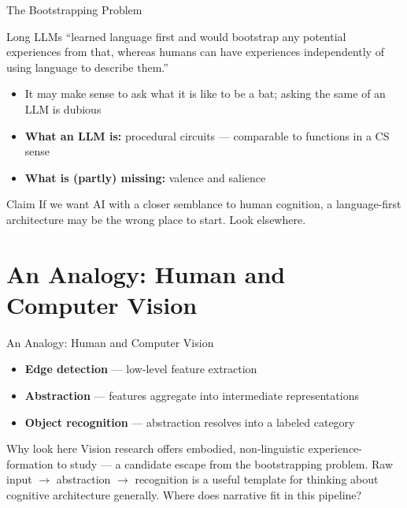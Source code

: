\documentclass[aspectratio=169]{beamer}
\begin{document}
\begin{frame}{The Bootstrapping Problem}
  \begin{block}{Long \parencite{long2026experience}}
    LLMs ``learned language first and would bootstrap any potential experiences from that, whereas humans can have experiences independently of using language to describe them.''
  \end{block}

  \pause
  \vspace{1em}
  \begin{itemize}
    \item<2-> It may make sense to ask what it is like to be a bat; asking the same of an LLM is dubious
    \item<3-> \textbf{What an LLM is:} procedural circuits --- comparable to functions in a CS sense
    \item<4-> \textbf{What is (partly) missing:} valence and salience
  \end{itemize}

  \pause
  \vspace{1em}
  \begin{alertblock}{Claim}
    If we want AI with a closer semblance to human cognition, a language-first architecture may be the wrong place to start. Look elsewhere.
  \end{alertblock}
\end{frame}

\section{An Analogy: Human and Computer Vision}

\begin{frame}{An Analogy: Human and Computer Vision}
  \begin{itemize}
    \item<1-> \textbf{Edge detection} --- low-level feature extraction
    \item<2-> \textbf{Abstraction} --- features aggregate into intermediate representations
    \item<3-> \textbf{Object recognition} --- abstraction resolves into a labeled category
  \end{itemize}

  \pause
  \vspace{1em}
  \begin{block}{Why look here}
    Vision research offers embodied, non-linguistic experience-formation to study --- a candidate escape from the bootstrapping problem. Raw input $\rightarrow$ abstraction $\rightarrow$ recognition is a useful template for thinking about cognitive architecture generally. Where does narrative fit in this pipeline?
  \end{block}
\end{frame}
\end{document}
